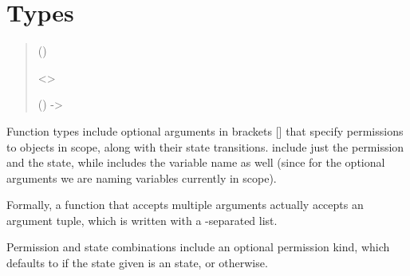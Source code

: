 \section{Types}

\begin{quote}


 {} 

 {} 

 ()


 {}

 {}

 {}

 {}


 {} <>

 {}


 {} 


 {} ()  -> 


 {} 


{ {} }



\end{quote}

Function types include optional arguments in brackets [] that specify
permissions to objects in scope, along with their state transitions.
 include just the permission and the state, while
 includes the variable name as well (since for the optional
arguments we are naming variables currently in scope).

Formally, a function that accepts multiple arguments actually accepts an
argument tuple, which is written with a \code{*}-separated list.

Permission and state combinations include an optional permission kind,
which defaults to  if the state given is an 
state, or  otherwise.

